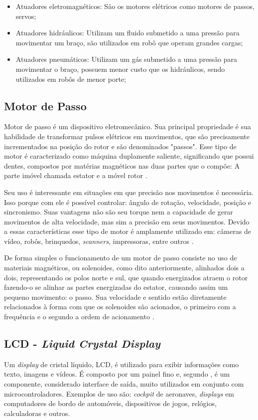\begin{itemize}
\item Atuadores eletromagnéticos: São os motores elétricos como motores de passos, servos;
\item Atuadores hidráulicos: Utilizam um fluido submetido a uma pressão para movimentar um braço, são utilizados em robô que operam grandes cargas;
\item Atuadores pneumáticos: Utilizam um gás submetido a uma pressão para movimentar o braço, possuem menor custo que os hidráulicos, sendo utilizados em robôs de menor porte;
\end{itemize}

\subsection{Motor de Passo}
Motor de passo é um dispositivo eletromecânico. Sua principal propriedade é sua habilidade de transformar pulsos elétricos em movimentos, que são precisamente incrementados na posição do rotor e são denominados "passos". Esse tipo de motor é caracterizado como máquina duplamente saliente, significando que possui dentes, compostos por matérias magnéticos nas duas partes que o compõe: A parte imóvel chamada estator e a móvel rotor \cite{demotor, acarnley2002stepping}.

Seu uso é interessante em situações em que precisão nos movimentos é necessária. Isso porque com ele é possível controlar: ângulo de rotação, velocidade, posição e sincronismo. Suas vantagens não são seu torque nem a capacidade de gerar movimentos de alta velocidade, mas sim a precisão em seus movimentos. Devido a essas características esse tipo de motor é amplamente utilizado em: câmeras de vídeo, robôs, brinquedos, \emph{scanners}, impressoras, entre outros \cite{demotor}.

De forma simples o funcionamento de um motor de passo consiste no uso de materiais magnéticos, ou solenoides, como dito anteriormente, alinhados dois a dois, representando os polos norte e sul, que quando energizados atraem o rotor fazendo-o se alinhar as partes energizadas do estator, causando assim um pequeno movimento: o passo. Sua velocidade e sentido estão diretamente relacionados à forma com que os solenoides são acionados, o primeiro com a frequência e o segundo a ordem de acionamento \cite{demotor, acarnley2002stepping}.

\subsection{LCD - \emph{Liquid Crystal Display}}
Um \emph{display} de cristal líquido, LCD, é utilizado para exibir informações como texto, imagens e vídeos. É composto por um painel fino e, segundo \cite{lcd1996unicamp}, é um componente, considerado interface de saída, muito utilizados em conjunto com microcontroladores. Exemplos de uso são: \emph{cockpit} de aeronaves, \emph{displays} em computadores de bordo de automóveis, dispositivos de jogos, relógios, calculadoras e outros.

